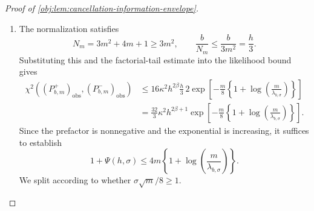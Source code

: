 \begin{proof}[Proof of \cref{obj:lem:cancellation-information-envelope}]
\begin{enumerate}
To calibrate this exponent, use
\[
\frac{m}{\lambda_{b,\sigma}}\ge256,
\qquad
\log\!\left(\frac{m}{\lambda_{b,\sigma}}\right)\ge8\log2,
\qquad
\log2\ge1-\frac12=\frac12.
\]
Monotonicity of the logarithm and \(J_m\ge m/2\) imply
\[
\log\!\left(\frac{J_m}{\mathrm e\,\lambda_{b,\sigma}}\right)
\ge
\log\!\left(\frac{m}{\lambda_{b,\sigma}}\right)-\log2-1
\ge7\log2-1\ge0.
\]
Hence
\[
\begin{aligned}
&J_m\log\!\left(\frac{J_m}{\mathrm e\,\lambda_{b,\sigma}}\right)
-\frac{\lambda_{b,\sigma}}6\\
&\qquad\ge
\frac m2\left\{
\log\!\left(\frac{m}{\lambda_{b,\sigma}}\right)-\log2-1
\right\}-\frac m{1536}\\
&\qquad\ge
\frac m8\left\{1+\log\!\left(\frac{m}{\lambda_{b,\sigma}}\right)\right\}.
\end{aligned}
\]
For the last inequality, the difference between its two sides, divided by \(m\), is
\[
\begin{aligned}
&\frac38\log\!\left(\frac{m}{\lambda_{b,\sigma}}\right)
-\frac12\log2-\frac58-\frac1{1536}\\
&\qquad\ge
\frac52\log2-\frac58-\frac1{1536}
\ge\frac58-\frac1{1536}>0.
\end{aligned}
\]
Combining the preceding estimates gives
\[
\begin{aligned}
\exp\!\left(\frac{\lambda_{b,\sigma}}6\right)
\sum_{j=m-1}^{\infty}\frac{\lambda_{b,\sigma}^{\,j}}{j!}
&\le
2\exp\!\left[
\frac{\lambda_{b,\sigma}}6
-J_m\log\!\left(\frac{J_m}{\mathrm e\,\lambda_{b,\sigma}}\right)
\right]\\
&\le
2\exp\!\left[
-\frac m8\left\{1+\log\!\left(\frac{m}{\lambda_{b,\sigma}}\right)\right\}
\right].
\end{aligned}
\]

\item The normalization satisfies
\[
N_m=3m^2+4m+1\ge3m^2,
\qquad
\frac{b}{N_m}\le\frac{b}{3m^2}=\frac h3.
\]
Substituting this and the factorial-tail estimate into the likelihood bound gives
\[
\begin{aligned}
\chi^2\!\left((P^+_{b,m})_{\mathrm{obs}},
             (P^-_{b,m})_{\mathrm{obs}}\right)
&\le
16\kappa^2h^{2\beta}\frac h3\,
2\exp\!\left[
-\frac m8\left\{1+\log\!\left(\frac{m}{\lambda_{b,\sigma}}\right)\right\}
\right]\\
&=
\frac{32}{3}\kappa^2h^{2\beta+1}
\exp\!\left[
-\frac m8\left\{1+\log\!\left(\frac{m}{\lambda_{b,\sigma}}\right)\right\}
\right].
\end{aligned}
\]
Since the prefactor is nonnegative and the exponential is increasing, it suffices to establish
\[
1+\Psi(h,\sigma)
\le
4m\left\{1+\log\!\left(\frac{m}{\lambda_{b,\sigma}}\right)\right\}.
\]
We split according to whether \(\sigma\sqrt m/8\ge1\).


\end{enumerate}
\end{proof}

